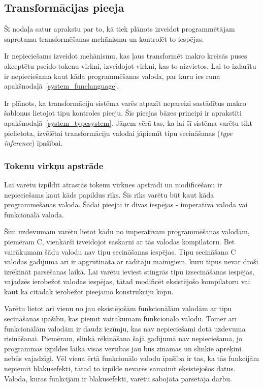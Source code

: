 \subsection{\label{subsec:system_qualities}Transformācijas pieeja}

Šī nodaļa satur aprakstu par to, kā tiek plānots izveidot programmētājam saprotamu transformēšanas mehānismu un kontrolēt to iespējas.

Ir nepieciešams izveidot mehānismu, kas ļaus transformēt makro kreisās puses akceptētu pseido-tokenu virkni, izveidojot virkni, kas to aizvietos. Lai to izdarītu ir nepieciešama kaut kāda programmēšanas valoda, par kuru ies runa apakšnodaļā~\ref{system_funclanguage}.

Ir plānots, ka transformāciju sistēma varēs atpazīt nepareizi sastādītus makro šablonus lietojot tipu kontroles pieeju. Šīs pieejas bāzes principi ir aprakstīti apakšnodaļā~\ref{system_typesystem}. Jāņem vērā tas, ka lai šī sistēma varētu tikt pielietota, izvēlētai transformāciju valodai jāpiemīt tipu secināšanas (\emph{type inference}) īpašībai.

\subsubsection{\label{system_funclanguage}Tokenu virkņu apstrāde}
Lai varētu izpildīt atrastās tokenu virknes apstrādi un modificēšanu ir nepieciešams kaut kāds papildus rīks. Šīs rīks varētu būt kaut kāda programmēšanas valoda. Šādai pieejai ir divas iespējas - imperatīvā valoda vai funkcionālā valoda.

Šīm uzdevumam varētu lietot kādu no imperatīvam programmēšanas valodām, piemēram C, vienkārši izveidojot saskarni ar tās valodas kompilatoru. Bet vairākumam šādu valodu nav tipu secināšanas iespējas. Tipu secināšana C valodas gadījumā arī ir apgrūtināta ar rādītāju mainīgiem, kuru tipus nevar droši izrēķināt parsēšanas laikā. Lai varētu ieviest stingrās tipu izsecināšanas iespējas, vajadzēs ierobežot valodas iespējas, tātad modificēt eksistējošo kompilatoru vai kaut kā citādāk ierobežot pieejamo konstrukciju kopu.

Varētu lietot arī vienu no jau eksistējošām funkcionālām valodām ar tipu secināšanas īpašību, kas piemīt vairākumam funkcionālo valodu. Tomēr arī funkcionālām valodām ir daudz iezīmju, kas nav nepieciešami dotā uzdevuma risināšanai. Piemēram, slinkā rēķināšana šajā gadījumā nav nepieciešama, jo programmas izpildes laikā visas vērtības jau būs zināmas un slinkie aprēķini nebūs vajadzīgi. Vēl viena ērtā funkcionālo valodu īpašība ir tas, ka tās funkcijām nepiemīt blakusefekti, tātad to izpilde nevarēs samainīt eksistējošos datus. Valoda, kuras funkcijām ir blakusefekti, varētu sabojāta parsētāja darbu.

